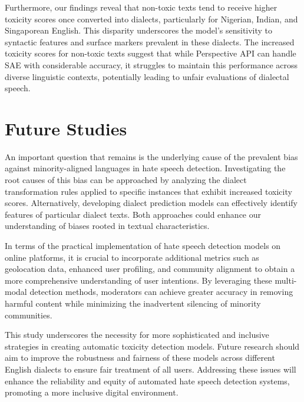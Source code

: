 \documentclass[11pt]{article}
\begin{document}
Furthermore, our findings reveal that non-toxic texts tend to receive higher toxicity scores once converted into dialects, particularly for Nigerian, Indian, and Singaporean English. This disparity underscores the model's sensitivity to syntactic features and surface markers prevalent in these dialects. The increased toxicity scores for non-toxic texts suggest that while Perspective API can handle SAE with considerable accuracy, it struggles to maintain this performance across diverse linguistic contexts, potentially leading to unfair evaluations of dialectal speech.

\section{Future Studies}

An important question that remains is the underlying cause of the prevalent bias against minority-aligned languages in hate speech detection. Investigating the root causes of this bias can be approached by analyzing the dialect transformation rules applied to specific instances that exhibit increased toxicity scores. Alternatively, developing dialect prediction models can effectively identify features of particular dialect texts. Both approaches could enhance our understanding of biases rooted in textual characteristics.

In terms of the practical implementation of hate speech detection models on online platforms, it is crucial to incorporate additional metrics such as geolocation data, enhanced user profiling, and community alignment to obtain a more comprehensive understanding of user intentions. By leveraging these multi-modal detection methods, moderators can achieve greater accuracy in removing harmful content while minimizing the inadvertent silencing of minority communities.

This study underscores the necessity for more sophisticated and inclusive strategies in creating automatic toxicity detection models. Future research should aim to improve the robustness and fairness of these models across different English dialects to ensure fair treatment of all users. Addressing these issues will enhance the reliability and equity of automated hate speech detection systems, promoting a more inclusive digital environment.












\end{document}
